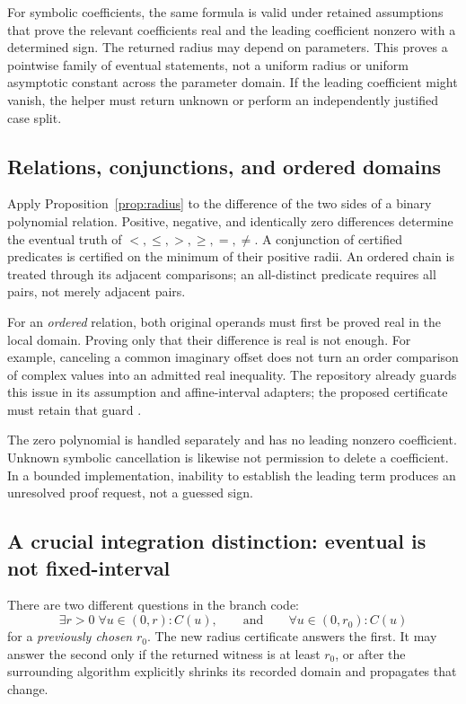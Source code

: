 \documentclass[11pt,a4paper]{article}
\theoremstyle{remark}
\begin{document}
For symbolic coefficients, the same formula is valid under retained assumptions that prove the relevant coefficients real and the leading coefficient nonzero with a determined sign. The returned radius may depend on parameters. This proves a pointwise family of eventual statements, not a uniform radius or uniform asymptotic constant across the parameter domain. If the leading coefficient might vanish, the helper must return unknown or perform an independently justified case split.

\subsection{Relations, conjunctions, and ordered domains}

Apply Proposition~\ref{prop:radius} to the difference of the two sides of a binary polynomial relation. Positive, negative, and identically zero differences determine the eventual truth of $<,\le,>,\ge,=,\ne$. A conjunction of certified predicates is certified on the minimum of their positive radii. An ordered chain is treated through its adjacent comparisons; an all-distinct predicate requires all pairs, not merely adjacent pairs.

For an \emph{ordered} relation, both original operands must first be proved real in the local domain. Proving only that their difference is real is not enough. For example, canceling a common imaginary offset does not turn an order comparison of complex values into an admitted real inequality. The repository already guards this issue in its assumption and affine-interval adapters; the proposed certificate must retain that guard \cite{mathicsassumptions,mathicsbranches,mathicssimplification}.

The zero polynomial is handled separately and has no leading nonzero coefficient. Unknown symbolic cancellation is likewise not permission to delete a coefficient. In a bounded implementation, inability to establish the leading term produces an unresolved proof request, not a guessed sign.

\subsection{A crucial integration distinction: eventual is not fixed-interval}

There are two different questions in the branch code:
\[
 \exists r>0\;\forall u\in(0,r):C(u),
 \qquad\text{and}\qquad
 \forall u\in(0,r_0):C(u)
\]
for a \emph{previously chosen} $r_0$. The new radius certificate answers the first. It may answer the second only if the returned witness is at least $r_0$, or after the surrounding algorithm explicitly shrinks its recorded domain and propagates that change.
\end{document}
